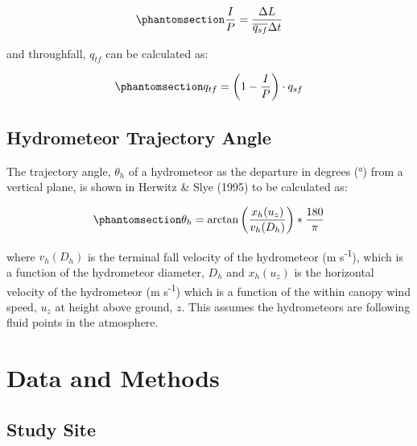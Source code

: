 \documentclass[
  letterpaper,
  DIV=11,
  numbers=noendperiod]{scrartcl}
\begin{document}
\begin{equation}\phantomsection\label{eq-ip}{
\frac{I}{P} = \frac{\Delta L}{\overline{q_{sf}} \Delta t}
}\end{equation}

and throughfall, \(q_{tf}\) can be calculated as:

\begin{equation}\phantomsection\label{eq-event-tf}{
q_{tf} = \left(1 - \frac{I}{P} \right) \cdot q_{sf}
}\end{equation}

\subsection{Hydrometeor Trajectory
Angle}\label{hydrometeor-trajectory-angle}

The trajectory angle, \(\theta_h\) of a hydrometeor as the departure in
degrees (°) from a vertical plane, is shown in Herwitz \& Slye (1995) to
be calculated as:

\begin{equation}\phantomsection\label{eq-ta}{
\theta_h = \arctan \left(\frac{x_h(u_z)}{v_h(D_h)}\right)*\frac{180}{\pi}
}\end{equation}

where \(v_h(D_h)\) is the terminal fall velocity of the hydrometeor (m
s\textsuperscript{-1}), which is a function of the hydrometeor diameter,
\(D_h\) and \(x_h(u_z)\) is the horizontal velocity of the hydrometeor
(m s\textsuperscript{-1}) which is a function of the within canopy wind
speed, \(u_z\) at height above ground, \(z\). This assumes the
hydrometeors are following fluid points in the atmosphere.

\section{Data and Methods}\label{data-and-methods}

\subsection{Study Site}\label{study-site}
\end{document}
